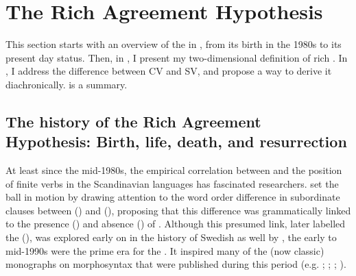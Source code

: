 \documentclass[output=paper,colorlinks,citecolor=brown,draft,draftmode]{langscibook}
\begin{document}
\section{The Rich Agreement Hypothesis }\label{sec:petzell:4}


This section starts with an overview of the  in , from its birth in the 1980s to its present day status. Then, in , I present my two-dimensional definition of rich . In , I address the difference between CV and SV, and propose a way to derive it diachronically.  is a summary.


\subsection{The history of the Rich Agreement Hypothesis: Birth, life, death, and resurrection}\label{sec:petzell:4.1}
\begin{sloppypar}
At least since the mid-1980s, the empirical correlation between  and the position of finite verbs in the Scandinavian languages has fascinated researchers. \citet{Kosmeijer1986} set the ball in motion by drawing attention to the word order difference in subordinate clauses between  () and  (), proposing that this difference was grammatically linked to the presence () and absence () of . Although this presumed link, later labelled the  (), was explored early on in the history of Swedish as well by \citet{Platzack1988emergence}, the early to mid-1990s were the prime era for the . It inspired many of the (now classic) monographs on  morphosyntax that were published during this period (e.g. \citealt{Falk1993}; \citealt{Rohrbacher1994}; \citealt{Vikner1994}; \citealt{HolmbergPlatzack1995}). 
\end{sloppypar}
\end{document}
